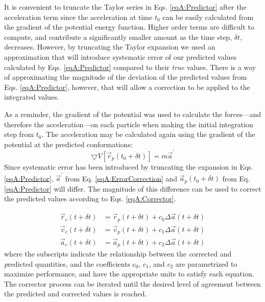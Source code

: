 It is convenient to truncate the Taylor series in Eqs. \ref{eqA:Predictor} after
the acceleration term since the acceleration at time $t_0$ can be easily
calculated from the gradient of the potential energy function. Higher order
terms are difficult to compute, and contribute a significantly smaller amount as
the time step, $\delta t$, decreases. However, by truncating the Taylor
expansion we used an approximation that will introduce systematic error of our
predicted values calculated by Eqs. \ref{eqA:Predictor} compared to their
\emph{true} values. There is a way of approximating the magnitude of the
deviation of the predicted values from Eqs. \ref{eqA:Predictor}, however, that
will allow a correction to be applied to the integrated values.

As a reminder, the gradient of the potential was used to calculate the
forces---and therefore the acceleration---on each particle when making the
initial integration step from $t_0$. The acceleration may be calculated again
using the gradient of the potential at the predicted conformations:
\begin{equation}
   \bigtriangledown V\left[\vec{r}_p(t_0 + \delta t)\right] = m \vec{a}^{\prime}
   \label{eqA:ErrorCorrection}
\end{equation}
Since systematic error has been introduced by truncating the expansion in Eqs.
\ref{eqA:Predictor}, $\vec{a}^{\prime}$ from Eq. \ref{eqA:ErrorCorrection} and
$\vec{a}_p(t_0 + \delta t)$ from Eq. \ref{eqA:Predictor} will differ. The
magnitude of this difference can be used to correct the predicted values
according to Eqs. \ref{eqA:Corrector}.

\begin{align}
   \vec{r}_c(t + \delta t) & = \vec{r}_p(t + \delta t) + c_0 \Delta \vec{a}(t +
         \delta t) \nonumber \\
   \vec{v}_c(t + \delta t) & = \vec{v}_p(t + \delta t) + c_1 \Delta \vec{a}(t +
         \delta t)
   \label{eqA:Corrector} \\
   \vec{a}_c(t + \delta t) & = \vec{a}_p(t + \delta t) + c_2 \Delta \vec{a}(t +
         \delta t) \nonumber
\end{align}
where the subscripts indicate the relationship between the \emph{c}orrected and
\emph{p}redicted quantities, and the coefficients $c_0$, $c_1$, and $c_2$ are
parametrized to maximize performance, \cite{Gear1966, Gear1971} and have the
appropriate units to satisfy each equation. \cite{Allen_Tildesley} The corrector
process can be iterated until the desired level of agreement between the
predicted and corrected values is reached.

